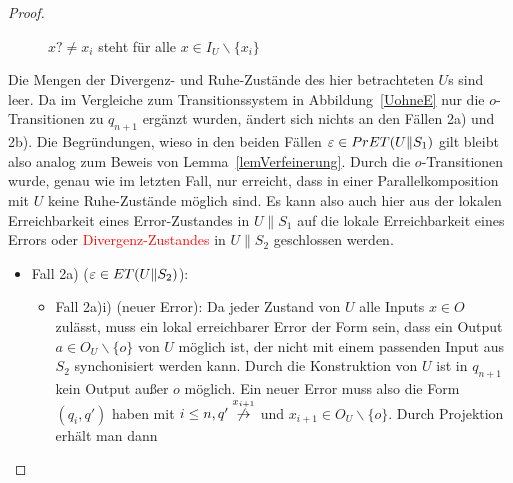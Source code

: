 \begin{proof}
\begin{itemize}
\begin{figure} [h!tbp]
\begin{center}
        \caption{$x?\neq x_i$ steht für alle $x\in I_U\backslash\{x_i\}$}
\label{UohneEmitO}
      \end{center}
      \end{figure}
      Die Mengen der Divergenz- und Ruhe-Zustände des hier betrachteten $U$s
      sind leer. Da im Vergleiche zum Transitionssystem in
      Abbildung~\ref{UohneE} nur die $o$-Transitionen zu $q_{n+1}$ ergänzt
      wurden, ändert sich nichts an den Fällen 2a) und 2b). Die Begründungen,
      wieso in den beiden Fällen $\varepsilon\in PrET{}(U\|S_1)$ gilt bleibt
      also analog zum Beweis von Lemma~\ref{lemVerfeinerung}. Durch die
      $o$-Transitionen wurde, genau wie im letzten Fall, nur erreicht, dass in
      einer Parallelkomposition mit $U$ keine Ruhe-Zustände möglich sind. Es
      kann also auch hier aus der lokalen Erreichbarkeit eines Error-Zustandes
      in $U\|S_1$ auf die lokale Erreichbarkeit eines Errors oder
      \textcolor{red}{Divergenz-Zustandes} in $U\|S_2$ geschlossen werden.
      \begin{itemize}
        \item Fall 2a) ($\varepsilon\in ET{}(U\|S_2)$):
          \begin{itemize}
            \item Fall 2a)i) (neuer Error): Da jeder Zustand von $U$ alle
              Inputs $x\in O$ zulässt, muss ein lokal erreichbarer Error der
              Form sein, dass ein Output $a\in O_U\backslash\{o\}$ von $U$
              möglich ist, der nicht mit einem passenden Input aus $S_2$
              synchonisiert werden kann. Durch die Konstruktion von $U$ ist in
              $q_{n+1}$ kein Output außer $o$ möglich. Ein neuer Error muss
              also die Form $(q_i,q')$ haben mit $i\leq n, q'
              \overset{x_{i+1}}{\not{\hspace{-0.1cm}\rightarrow}}$ und
              $x_{i+1}\in O_U\backslash\{o\}$. Durch Projektion erhält man dann

\end{itemize}
\end{itemize}
\end{itemize}
\end{proof}
